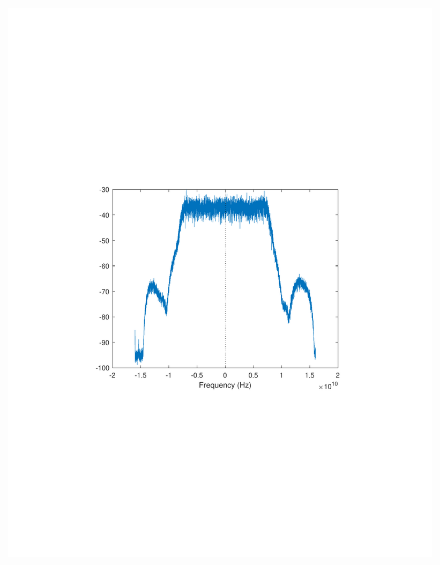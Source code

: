 \begin{refsection}
\begin{figure}[H]
	\centering
	\begin{minipage}{0.30\textwidth}
		\centering
		\includegraphics[clip, trim=4cm 8cm 4cm 8cm, width=1\textwidth]{./sdf/m_qam_system/figures/expResults/intradyne/4_16GBdInSig13dB_AfFE.pdf}
		\label{fig:16GBdEyeFE2}
	\end{minipage}
	\begin{minipage}{0.30\textwidth}
		\centering

\end{minipage}
\end{figure}
\end{refsection}
